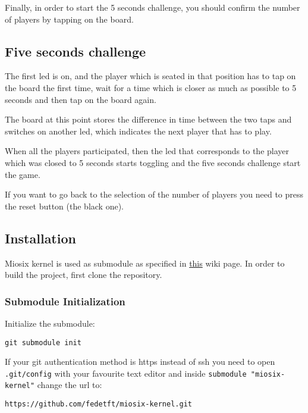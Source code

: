 Finally, in order to start the 5 seconds challenge, you should confirm the number of players by tapping on the board.

\subsection{Five seconds challenge}
The first led is on, and the player which is seated in that position has to
tap on the board the first time, wait for a time which is closer as much as
possible to 5 seconds and then tap on the board again.

The board at this point stores the difference in time between the two taps and
switches on another led, which indicates the next player that has to play.

When all the players participated, then the led that corresponds to the player
which was closed to 5 seconds starts toggling and the five seconds challenge start
the game.

If you want to go back to the selection of the number of players you need to
press the reset button (the black one).

\hypertarget{installation}{%
\subsection{Installation}\label{installation}}

Miosix kernel is used as submodule as specified in
\href{https://miosix.org/wiki/index.php?title=Miosix_and_git_workflow\#Setting_up_an_out_of_git_tree_project}{this}
wiki page.
In order to build the project, first clone the repository.

\hypertarget{submodule-initialization}{%
\subsubsection{Submodule
Initialization}\label{submodule-initialization}}

Initialize the submodule:

\begin{verbatim}
git submodule init
\end{verbatim}

If your git authentication method is https instead of ssh you need to
open \texttt{.git/config} with your favourite text editor and inside
\texttt{submodule\ "miosix-kernel"} change the url to:

\begin{verbatim}
https://github.com/fedetft/miosix-kernel.git
\end{verbatim}


